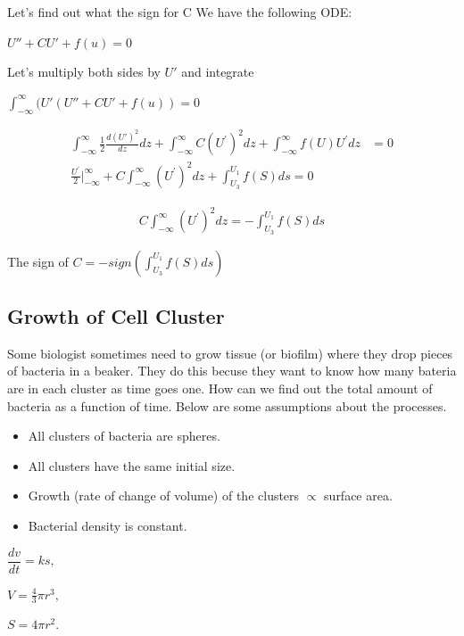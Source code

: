 \documentclass[]{article}
\numberwithin{equation}{section}		%
\begin{document}
Let's find out what the sign for C
We have the following ODE:

\begin{center}
$U'' + CU' + f(u) = 0$
\end{center}

Let's multiply both sides by $U'$ and integrate

\begin{center}
$\int _{-\infty}^{\infty} (U' (U''+CU'+f (u ) )=0$
\end{center}

\begin{align}
\int_{-\infty}^{\infty}\frac{1}{2}\frac{d({U}')^2}{dz}dz+\int_{-\infty}^{\infty}C(U^{'})^{2}dz+\int_{-\infty}^{\infty}f(U)U^{'}dz & =0\\
\frac{U^{'}}{2}|_{-\infty}^{\infty}\nonumber+C\int_{-\infty}^{\infty}(U^{'})^{2}dz\nonumber+\int_{U_{3}}^{U_{1}}f(S)ds=0
\end{align}

\begin{align}
C\int_{-\infty}^{\infty}(U^{'})^{2}dz\nonumber=-\int_{U_{3}}^{U_{1}}f(S)ds
\end{align}

The sign of $C = -sign (\int _{U_3}^{U_1}f (S )ds )$

\subsection{Growth of Cell Cluster}
Some biologist sometimes need to grow tissue (or biofilm) where they drop pieces of bacteria in a beaker. They do this becuse they want to know how many bateria are in each cluster as time goes one. How can we find out the total amount of bacteria as a function of time. Below are some assumptions about the processes.

\begin{itemize}
	\item All clusters of bacteria are spheres.
	\item All clusters have the same initial size.
	\item Growth (rate of change of volume) of the clusters $\propto$ surface area.
	\item Bacterial density is constant.
\end{itemize}
\begin{center}
$\dfrac{dv}{dt}=ks,$
\end{center}
\begin{center}
$V=\frac{4}{3}\pi r^{3},$
\end{center}
\begin{center}
$S=4\pi r^{2}.$
\end{center}
\end{document}
